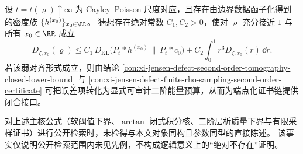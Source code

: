 \begin{conclusion}\label{con:xi-endpoint-defect-poisson-kl-second-order-energy-dominant-alignment}
设 \(t=t(\varrho)\uparrow\infty\) 为 Cayley--Poisson 尺度对应，且存在由边界数据函子化得到的密度族 \(\{h^{(x_0)}\}_{x_0\in\RR}\)。
猜想存在绝对常数 \(C_1,C_2>0\)，使对 \(\varrho\) 充分接近 \(1\) 与所有 \(x_0\in\RR\) 成立
\[
D_{\zeta,x_0}(\varrho)
\le
C_1\,D_{\mathrm{KL}}\!\bigl(P_t*h^{(x_0)}\,\big\|\,P_t*c_0\bigr)
+C_2\!\int_0^1 r^3D_{\zeta,x_0}(r)\,\dd r.
\]
若该弱对齐形式成立，则由结论
\ref{con:xi-jensen-defect-second-order-tomography-closed-lower-bound}
与 \ref{con:xi-jensen-defect-finite-rho-sampling-second-order-certificate}
可把误差项转化为显式可审计二阶能量预算，从而为端点化证书链提供闭合接口。
\end{conclusion}

\begin{remark}[公开检索说明]\label{rem:xi-jensen-soft-threshold-public-retrieval-note}
对上述主核公式（软阈值下界、\(\arctan\) 闭式积分核、二阶层析质量下界与有限采样证书）进行公开检索时，未检得与本文对象同构且参数同型的直接陈述。
该事实仅说明公开检索范围内未见先例，不构成逻辑意义上的“绝对不存在”证明。
\end{remark}
